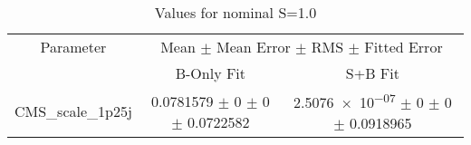 \begin{table}
\centering
\caption{Values for nominal S=1.0}
\begin{tabular}{ccc}
\toprule
Parameter 	& \multicolumn{2}{c}{Mean $\pm$ Mean Error $\pm$ RMS $\pm$ Fitted Error}\\
 	& B-Only Fit & S+B Fit\\
\midrule
CMS\_scale\_1p25j 	& \num{0.0781579} $\pm$ \num{0} $\pm$ \num{0} $\pm$ \num{0.0722582} 	& \num{2.5076e-07} $\pm$ \num{0} $\pm$ \num{0} $\pm$ \num{0.0918965}\\
\bottomrule
\end{tabular}
\end{table}